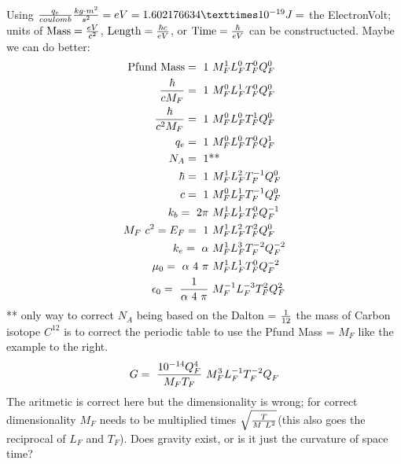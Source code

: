 \begin{multicols}{2}
Using ${q_e \over coulomb}{kg\cdot m^2 \over s^2}=eV=1.602176634×10^{-19} J =$ the ElectronVolt; units of $\text{Mass}={eV \over c^2}$, $\text{Length}={\hbar c \over eV}$, or $\text{Time}={\hbar \over eV}$ can be constructucted.  Maybe we can do better:
\begin{align*}
\text{Pfund Mass} = ~1 &~M_F^{1}L_F^{0}T_F^{0}Q_F^{0}\\
{\hbar \over c M_F} = ~1 &~M_F^{0}L_F^{1}T_F^{0}Q_F^{0}\\
{\hbar \over c^2 M_F} = ~1&~M_F^{0}L_F^{0}T_F^{1}Q_F^{0}\\
q_e = ~1 &~M_F^{0}L_F^{0}T_F^{0}Q_F^{1}\\
N_A = ~1 &\text{**}\\
\hbar = ~1 & ~M_F^{1}L_F^{2}T_F^{-1}Q_F^{0}\\
c = ~1 & ~M_F^{0}L_F^{1}T_F^{-1}Q_F^{0}\\
k_b = ~2\pi & ~M_F^{1}L_F^{1}T_F^{0}Q_F^{-1}\\
M_F~ c^2 =E_F = ~1 & ~M_F^{1}L_F^{2}T_F^{2}Q_F^{0}\\
k_e = ~\alpha &~M_F^{1}L_F^{3}T_F^{-2}Q_F^{-2}\\
\mu _0 = ~\alpha~4~\pi &~M_F^{1}L_F^{1}T_F^{0}Q_F^{-2}\\
\epsilon _0 = ~{1 \over \alpha~4~\pi} & ~M_F^{-1}L_F^{-3}T_F^{2}Q_F^{2}%
\end{align*}
** only way to correct $N_A$ being based on the Dalton = ${1 \over 12}$ the mass of Carbon isotope $C^{12}$ is to correct the periodic table to use the Pfund Mass = $M_F$ like the example to the right.
$$G = ~{10^{-14} Q^4_F\over M_F T_F} ~M_F^{3}L_F^{-1}T_F^{-2}Q_F^{}$$
The aritmetic is correct here but the dimensionality is wrong; for correct dimensionality $M_F$ needs to be multiplied times $\sqrt{T \over M~L^2}$(this also goes the reciprocal of $L_F$ and $T_F$).  Does gravity exist, or is it just the curvature of space time?


\end{multicols}
